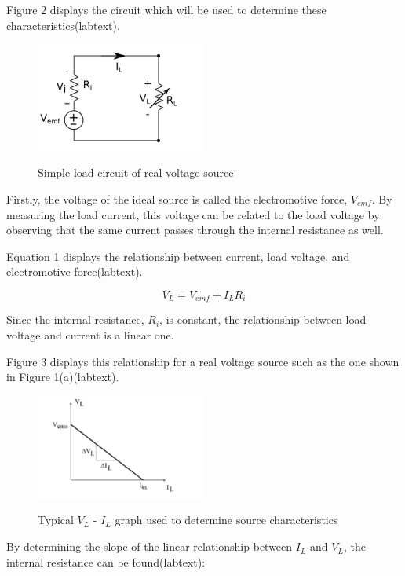\documentclass[a4paper]{article}
\begin{document}
\newpage
Figure 2 displays the circuit which will be used to determine these
characteristics(labtext).

\begin{figure}[!ht]
    \centering
    \includegraphics[width = 0.5\textwidth]{loadcircuit.png}
    \label{fig:2}
    \caption{Simple load circuit of real voltage source}
\end{figure}

Firstly, the voltage of the ideal source is called the electromotive force,
$V_{emf}$. By measuring the load current, this voltage can be related to the
load voltage by observing that the same current passes through the internal
resistance as well. 

Equation 1 displays the relationship between current, load
voltage, and electromotive force(labtext).

\begin{equation}
    V_L = V_{emf} + I_L R_i
\end{equation}

Since the internal resistance, $R_i$, is constant, the relationship between load
voltage and current is a linear one. 

Figure 3 displays this relationship for a
real voltage source such as the one shown in Figure 1(a)(labtext).

\begin{figure}[!ht]
    \centering
    \includegraphics[width = 0.5\textwidth]{vi_graph.png}
    \label{fig:3}
    \caption{Typical $V_L$ - $I_L$ graph used to determine source characteristics}
\end{figure}

By determining the slope of the linear relationship between $I_L$ and $V_L$, the
internal resistance can be found(labtext):
\end{document}
